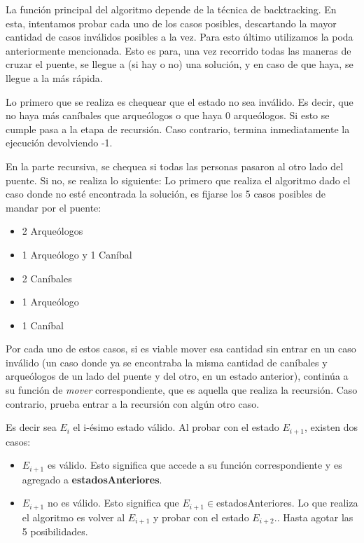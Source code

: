       \par La función principal del algoritmo depende de la técnica de backtracking. En esta, intentamos probar cada uno de los casos posibles, descartando la mayor cantidad de casos inválidos posibles a la vez. Para esto último utilizamos la poda anteriormente mencionada. Esto es para, una vez recorrido todas las maneras de cruzar el puente, se llegue a (si hay o no) una solución, y en caso de que haya, se llegue a la más rápida.

      \par Lo primero que se realiza es chequear que el estado no sea inválido. Es decir, que no haya más caníbales que arqueólogos o que haya 0 arqueólogos. Si esto se cumple pasa a la etapa de recursión. Caso contrario, termina inmediatamente la ejecución devolviendo -1.

      \par En la parte recursiva, se chequea si todas las personas pasaron al otro lado del puente. Si no, se realiza lo siguiente:
      Lo primero que realiza el algoritmo dado el caso donde no esté encontrada la solución, es fijarse los 5 casos posibles de mandar por el puente:

      \begin{itemize}
      	\item 2 Arqueólogos
      	\item 1 Arqueólogo y 1 Caníbal
      	\item 2 Caníbales
      	\item 1 Arqueólogo
      	\item 1 Caníbal
      \end{itemize}

       Por cada uno de estos casos, si es viable mover esa cantidad sin entrar en un caso inválido (un caso donde ya se encontraba la misma cantidad de caníbales y arqueólogos de un lado del puente y del otro, en un estado anterior), continúa a su función de \emph{mover} correspondiente, que es aquella que realiza la recursión. Caso contrario, prueba entrar a la recursión con algún otro caso. 

       Es decir sea $E_{i}$ el i-ésimo estado válido. Al probar con el estado $E_{i+1}$, existen dos casos:

       \begin{itemize}
       	\item $E_{i+1}$ es válido. Esto significa que accede a su función correspondiente y es agregado a \textbf{estadosAnteriores}.
       	\item $E_{i+1}$ no es válido. Esto significa que $E_{i+1} \in$estadosAnteriores. Lo que realiza el algoritmo es volver al $E_{i+1}$ y probar con el estado $E_{i+2}$.. Hasta agotar las 5 posibilidades.
       \end{itemize}

